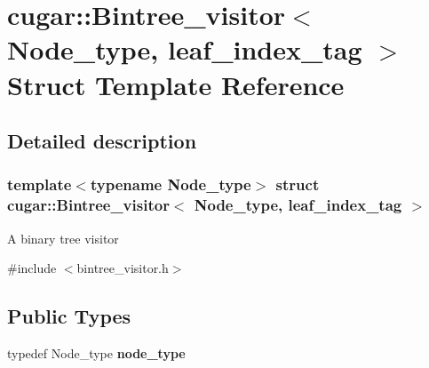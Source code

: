 \hypertarget{structcugar_1_1_bintree__visitor_3_01_node__type_00_01leaf__index__tag_01_4}{}\section{cugar\+:\+:Bintree\+\_\+visitor$<$ Node\+\_\+type, leaf\+\_\+index\+\_\+tag $>$ Struct Template Reference}
\label{structcugar_1_1_bintree__visitor_3_01_node__type_00_01leaf__index__tag_01_4}


\subsection{Detailed description}
\subsubsection*{template$<$typename Node\+\_\+type$>$\newline
struct cugar\+::\+Bintree\+\_\+visitor$<$ Node\+\_\+type, leaf\+\_\+index\+\_\+tag $>$}

A binary tree visitor 

{\ttfamily \#include $<$bintree\+\_\+visitor.\+h$>$}

\subsection*{Public Types}
\begin{DoxyCompactItemize}
\item 
\mbox{\label{structcugar_1_1_bintree__visitor_3_01_node__type_00_01leaf__index__tag_01_4_ab979a75ab764fe6d3351d5b845aedd3b}} 
typedef Node\+\_\+type {\bfseries node\+\_\+type}
\end{DoxyCompactItemize}
